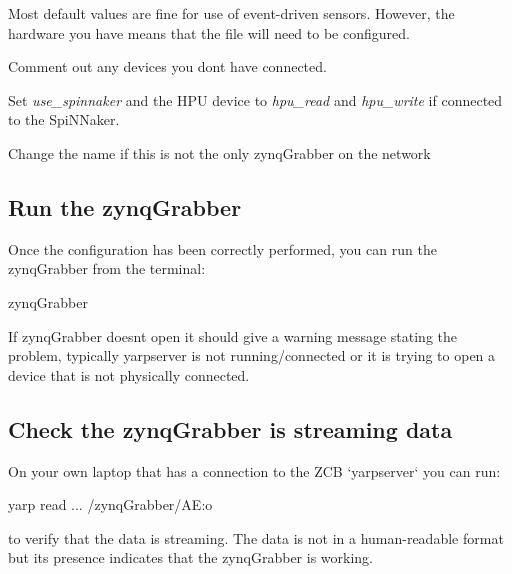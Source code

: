 Most default values are fine for use of {\ttfamily event-\/driven} sensors. However, the hardware you have means that the file will need to be configured.


\begin{DoxyItemize}
\item Comment out any devices you don\textquotesingle{}t have connected.
\item Set {\itshape use\+\_\+spinnaker} and the H\+PU device to {\itshape hpu\+\_\+read} and {\itshape hpu\+\_\+write} if connected to the Spi\+N\+Naker.
\item Change the name if this is not the only {\ttfamily zynq\+Grabber} on the network
\end{DoxyItemize}

\subsection*{Run the {\ttfamily zynq\+Grabber}}

Once the configuration has been correctly performed, you can run the {\ttfamily zynq\+Grabber} from the terminal\+: 
\begin{DoxyCode}
zynqGrabber
\end{DoxyCode}
 If {\ttfamily zynq\+Grabber} doesn\textquotesingle{}t open it should give a warning message stating the problem, typically {\ttfamily yarpserver} is not running/connected or it is trying to open a device that is not physically connected.

\subsection*{Check the zynq\+Grabber is streaming data}

On your own laptop that has a connection to the Z\+CB `yarpserver` you can run\+: 
\begin{DoxyCode}
yarp read ... /zynqGrabber/AE:o
\end{DoxyCode}
 to verify that the data is streaming. The data is not in a human-\/readable format but it\textquotesingle{}s presence indicates that the {\ttfamily zynq\+Grabber} is working. 